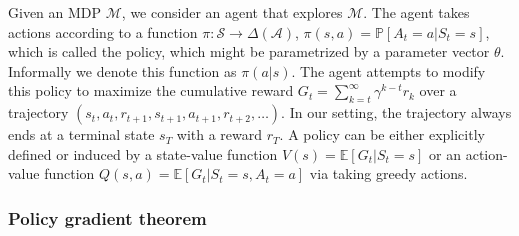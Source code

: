 Given an MDP $\mathcal{M}$, we consider an agent that explores $\mathcal{M}$. The agent takes actions according to a function $\pi:\mathcal{S}\rightarrow\Delta(\mathcal{A})$, $\pi(s, a) = \mathbb{P}[A_t = a | S_t = s]$, which is called the policy, which might be parametrized by a parameter vector $\theta$. Informally we denote this function as $\pi(a | s)$. The agent attempts to modify this policy to maximize the cumulative reward $G_t = \sum_{k=t}^{\infty} \gamma^{k - t} r_k$ over a trajectory $(s_t, a_t, r_{t+1}, s_{t+1}, a_{t+1}, r_{t+2}, \dots)$. In our setting, the trajectory always ends at a terminal state $s_T$ with a reward $r_T$. A policy can be either explicitly defined or induced by a state-value function $V(s) = \mathbb{E}[G_t | S_t = s]$ or an action-value function $Q(s, a) = \mathbb{E}[G_t | S_t = s, A_t = a]$ \cite{SuttonAndBarto2018} via taking greedy actions.








\subsubsection{Policy gradient theorem}

